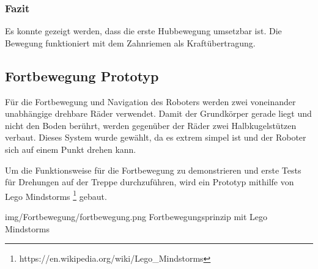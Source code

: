 \subsubsection{Fazit}

Es konnte gezeigt werden, dass die erste Hubbewegung umsetzbar ist. Die Bewegung funktioniert mit dem Zahnriemen als Kraftübertragung.

\newpage
\subsection{Fortbewegung Prototyp}
Für die Fortbewegung und Navigation des Roboters werden zwei voneinander unabhängige drehbare Räder verwendet. Damit der Grundkörper gerade liegt und nicht den Boden berührt, werden gegenüber der Räder zwei Halbkugelstützen verbaut.
Dieses System wurde gewählt, da es extrem simpel ist und der Roboter sich auf einem Punkt drehen kann.

Um die Funktionsweise für die Fortbewegung zu demonstrieren und erste Tests für Drehungen auf
der Treppe durchzuführen, wird ein Prototyp mithilfe von Lego Mindstorms \footnote{https://en.wikipedia.org/wiki/Lego\_Mindstorms}
gebaut.

\image
  {img/Fortbewegung/fortbewegung.png}
  {Fortbewegungsprinzip mit Lego Mindstorms}



